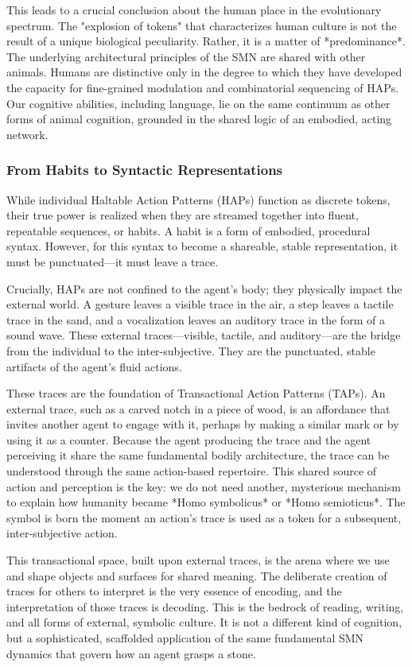 This leads to a crucial conclusion about the human place in the evolutionary spectrum. The "explosion of tokens" that characterizes human culture is not the result of a unique biological peculiarity. Rather, it is a matter of *predominance*. The underlying architectural principles of the SMN are shared with other animals. Humans are distinctive only in the degree to which they have developed the capacity for fine-grained modulation and combinatorial sequencing of HAPs. Our cognitive abilities, including language, lie on the same continuum as other forms of animal cognition, grounded in the shared logic of an embodied, acting network.

\subsubsection{From Habits to Syntactic Representations}
\label{ssubsec:habits}
While individual Haltable Action Patterns (HAPs) function as discrete tokens, their true power is realized when they are streamed together into fluent, repeatable sequences, or habits. A habit is a form of embodied, procedural syntax. However, for this syntax to become a shareable, stable representation, it must be punctuated—it must leave a trace.

Crucially, HAPs are not confined to the agent's body; they physically impact the external world. A gesture leaves a visible trace in the air, a step leaves a tactile trace in the sand, and a vocalization leaves an auditory trace in the form of a sound wave. These external traces—visible, tactile, and auditory—are the bridge from the individual to the inter-subjective. They are the punctuated, stable artifacts of the agent's fluid actions.

These traces are the foundation of Transactional Action Patterns (TAPs). An external trace, such as a carved notch in a piece of wood, is an affordance that invites another agent to engage with it, perhaps by making a similar mark or by using it as a counter. Because the agent producing the trace and the agent perceiving it share the same fundamental bodily architecture, the trace can be understood through the same action-based repertoire. This shared source of action and perception is the key: we do not need another, mysterious mechanism to explain how humanity became *Homo symbolicus* or *Homo semioticus*. The symbol is born the moment an action's trace is used as a token for a subsequent, inter-subjective action.

This transactional space, built upon external traces, is the arena where we use and shape objects and surfaces for shared meaning. The deliberate creation of traces for others to interpret is the very essence of encoding, and the interpretation of those traces is decoding. This is the bedrock of reading, writing, and all forms of external, symbolic culture. It is not a different kind of cognition, but a sophisticated, scaffolded application of the same fundamental SMN dynamics that govern how an agent grasps a stone.

